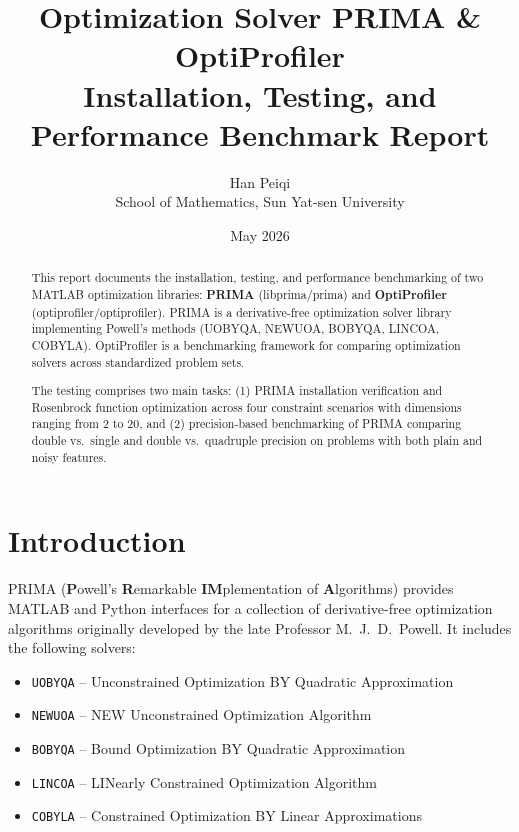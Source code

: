 \documentclass[11pt,a4paper]{article}
\title{\textbf{Optimization Solver PRIMA \& OptiProfiler\\[4pt]
        Installation, Testing, and Performance Benchmark Report}}
\author{Han Peiqi \\[4pt]
        School of Mathematics, Sun Yat-sen University}
\date{May 2026}
\begin{document}
\maketitle
\thispagestyle{empty}
\begin{abstract}
This report documents the installation, testing, and performance benchmarking
of two MATLAB optimization libraries: \textbf{PRIMA} (libprima/prima) and
\textbf{OptiProfiler} (optiprofiler/optiprofiler). PRIMA is a derivative-free
optimization solver library implementing Powell's methods (UOBYQA, NEWUOA,
BOBYQA, LINCOA, COBYLA). OptiProfiler is a benchmarking framework for comparing
optimization solvers across standardized problem sets.

The testing comprises two main tasks: (1) PRIMA installation verification and
Rosenbrock function optimization across four constraint scenarios with
dimensions ranging from 2 to 20, and (2) precision-based benchmarking of PRIMA
comparing double vs.\ single and double vs.\ quadruple precision on problems
with both plain and noisy features.
\end{abstract}


\newpage
\tableofcontents
\newpage


\section{Introduction}

PRIMA (\textbf{P}owell's \textbf{R}emarkable \textbf{IM}plementation of
\textbf{A}lgorithms) provides MATLAB and Python interfaces for a collection of
derivative-free optimization algorithms originally developed by the late
Professor M.~J.~D.~Powell. It includes the following solvers:
\begin{itemize}[noitemsep]
    \item \texttt{UOBYQA} -- Unconstrained Optimization BY Quadratic Approximation
    \item \texttt{NEWUOA} -- NEW Unconstrained Optimization Algorithm
    \item \texttt{BOBYQA} -- Bound Optimization BY Quadratic Approximation
    \item \texttt{LINCOA} -- LINearly Constrained Optimization Algorithm
    \item \texttt{COBYLA} -- Constrained Optimization BY Linear Approximations
\end{itemize}
\end{document}
